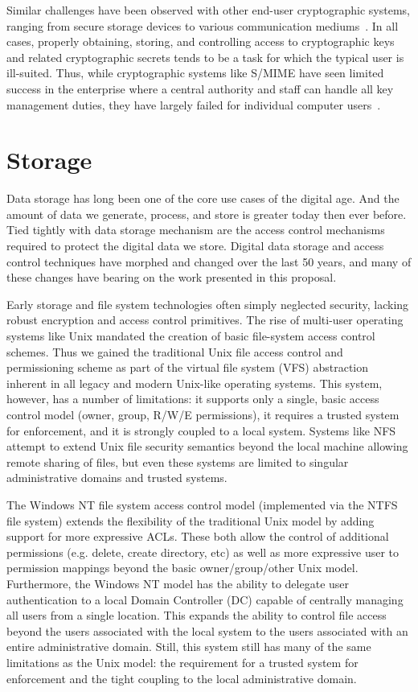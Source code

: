 Similar challenges have been observed with other end-user
cryptographic systems, ranging from secure storage devices to various
communication mediums~\cite{Sweikata2009}. In all cases, properly
obtaining, storing, and controlling access to cryptographic keys and
related cryptographic secrets tends to be a task for which the typical
user is ill-suited. Thus, while cryptographic systems like S/MIME have
seen limited success in the enterprise where a central authority and
staff can handle all key management duties, they have largely failed
for individual computer users~\cite{ramsdell-rfc5751}.

\section{Storage}
\label{chap:background:storage}

Data storage has long been one of the core use cases of the digital
age. And the amount of data we generate, process, and store is greater
today then ever before. Tied tightly with data storage mechanism are
the access control mechanisms required to protect the digital data we
store. Digital data storage and access control techniques have morphed
and changed over the last 50 years, and many of these changes have
bearing on the work presented in this proposal.

Early storage and file system technologies often simply neglected
security, lacking robust encryption and access control primitives. The
rise of multi-user operating systems like Unix mandated the creation
of basic file-system access control schemes. Thus we gained the
traditional Unix file access control and permissioning scheme as part
of the virtual file system (VFS) abstraction inherent in all legacy
and modern Unix-like operating systems. This system, however, has a
number of limitations: it supports only a single, basic access control
model (owner, group, R/W/E permissions), it requires a trusted system
for enforcement, and it is strongly coupled to a local system. Systems
like NFS attempt to extend Unix file security semantics beyond the
local machine allowing remote sharing of files, but even these systems
are limited to singular administrative domains and trusted systems.

The Windows NT file system access control model (implemented via the
NTFS file system) extends the flexibility of the traditional Unix
model by adding support for more expressive ACLs. These both allow the
control of additional permissions (e.g. delete, create directory, etc)
as well as more expressive user to permission mappings beyond the
basic owner/group/other Unix model. Furthermore, the Windows NT model
has the ability to delegate user authentication to a local Domain
Controller (DC) capable of centrally managing all users from a single
location. This expands the ability to control file access beyond the
users associated with the local system to the users associated with an
entire administrative domain. Still, this system still has many of the
same limitations as the Unix model: the requirement for a trusted
system for enforcement and the tight coupling to the local
administrative domain.

